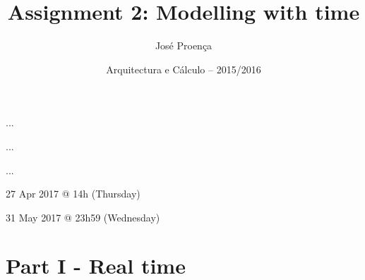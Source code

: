 \documentclass[11pt]{article}
\date{Arquitectura e C\'alculo -- 2015/2016}
\begin{document}
 
 
\title{Assignment 2: Modelling with time}
\author{Jos\'{e} Proen\c{c}a}
 
\maketitle

  ...

 ...

 ...

 27 Apr 2017 @ 14h (Thursday)

 31 May 2017 @ 23h59 (Wednesday)
 
\section*{Part I - Real time}

%
%
%
%
%
\end{document}
